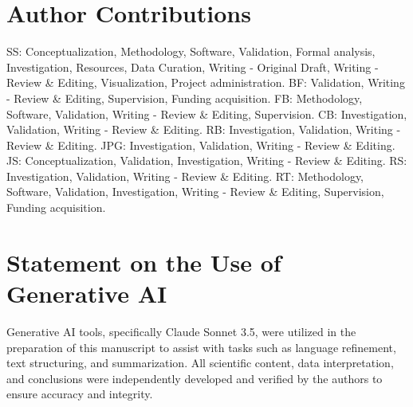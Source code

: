 \documentclass[12pt,a4paper]{article}
\begin{document}
\section*{Author Contributions}
SS: Conceptualization, Methodology, Software, Validation, Formal analysis, Investigation, Resources, Data Curation, Writing - Original Draft, Writing - Review \& Editing, Visualization, Project administration. BF: Validation, Writing - Review \& Editing, Supervision, Funding acquisition. FB: Methodology, Software, Validation, Writing - Review \& Editing, Supervision. CB: Investigation, Validation, Writing - Review \& Editing. RB: Investigation, Validation, Writing - Review \& Editing. JPG: Investigation, Validation, Writing - Review \& Editing. JS: Conceptualization, Validation, Investigation, Writing - Review \& Editing. RS: Investigation, Validation, Writing - Review \& Editing. RT: Methodology, Software, Validation, Investigation, Writing - Review \& Editing, Supervision, Funding acquisition.

\section*{Statement on the Use of Generative AI}
Generative AI tools, specifically Claude Sonnet 3.5, were utilized in the preparation of this manuscript to assist with tasks such as language refinement, text structuring, and summarization. All scientific content, data interpretation, and conclusions were independently developed and verified by the authors to ensure accuracy and integrity.




\clearpage

\end{document}
